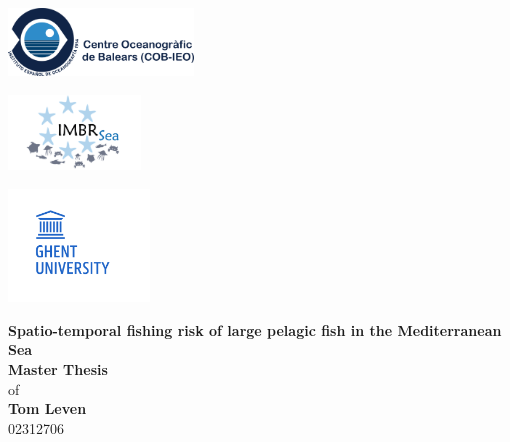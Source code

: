 \begin{titlepage}
    \begin{center}
        


\begin{minipage}{0.3\textwidth}
    \begin{flushleft}
        \includegraphics[height=1.8cm]{Figures/logo_cob.png} %
    \end{flushleft}
  \end{minipage}
  \hfill
  \begin{minipage}{0.3\textwidth}
    \begin{center}
      \includegraphics[height=2cm]{Figures/logo_imbrsea.png} %
    \end{center}
  \end{minipage}
  \hfill  
  \begin{minipage}{0.3\textwidth}
    \begin{flushright}
      \includegraphics[height=3cm]{Figures/logo_ghent.png} %
    \end{flushright}
  \end{minipage}
  
  \vspace{1.8cm}
  
  \begin{center}
    {\LARGE \textbf{Spatio-temporal fishing risk of large pelagic fish in the Mediterranean Sea}}\\[0.5cm]
  
    \textbf{Master Thesis}\\[0.5cm]
    of\\[0.5cm]
    \textbf{Tom Leven}\\[0.5cm]
    02312706\\[1.5cm]
  

\end{center}
\end{center}
\end{titlepage}
